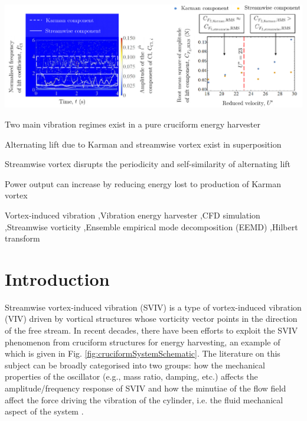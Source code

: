 \documentclass[a4paper,fleqn]{cas-sc}
\begin{document}
\begin{graphicalabstract}
  \includegraphics[width=1\textwidth]{figs/graphicalAbstract}
\end{graphicalabstract}

\begin{highlights}
\item Two main vibration regimes exist in a pure cruciform energy harvester
\item Alternating lift due to Karman and streamwise vortex exist in superposition
\item Streamwise vortex disrupts the periodicity and self-similarity of alternating lift
\item Power output can increase by reducing energy lost to production of Karman vortex
\end{highlights}

\begin{keywords}
  Vortex-induced vibration \sep Vibration energy harvester \sep CFD simulation \sep Streamwise vorticity \sep Ensemble empirical mode decomposition (EEMD) \sep Hilbert transform
\end{keywords}

\maketitle

\doublespacing

\section{Introduction} \label{sec:intro}
Streamwise vortex-induced vibration (SVIV) is a type of vortex-induced vibration (VIV) driven by vortical structures whose vorticity vector points in the direction of the free stream. In recent decades, there have been efforts to exploit the SVIV phenomenon from cruciform structures for energy harvesting, an example of which is given in Fig. \ref{fig:cruciformSystemSchematic}. The literature on this subject can be broadly categorised into two groups: how the mechanical properties of the oscillator (e.g., mass ratio, damping, etc.) affects the amplitude/frequency response of SVIV \citep{Koide2009,Koide2013,Nguyen2012} and how the minutiae of the flow field affect the force driving the vibration of the cylinder, i.e. the fluid mechanical aspect of the system \citep{Deng2007,Koide2017,Zhao2018a}.
\end{document}
